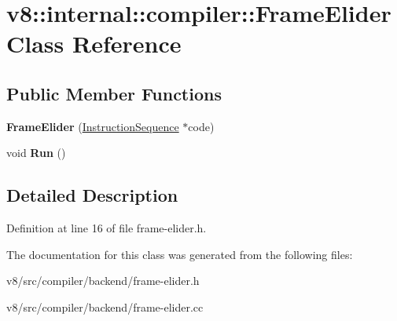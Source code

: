 \hypertarget{classv8_1_1internal_1_1compiler_1_1FrameElider}{}\section{v8\+:\+:internal\+:\+:compiler\+:\+:Frame\+Elider Class Reference}
\label{classv8_1_1internal_1_1compiler_1_1FrameElider}
\subsection*{Public Member Functions}
\begin{DoxyCompactItemize}
\item 
\mbox{\label{classv8_1_1internal_1_1compiler_1_1FrameElider_a33cd828ec6aafd685b955e1cf6670d43}} 
{\bfseries Frame\+Elider} (\mbox{\hyperlink{classv8_1_1internal_1_1compiler_1_1InstructionSequence}{Instruction\+Sequence}} $\ast$code)
\item 
\mbox{\label{classv8_1_1internal_1_1compiler_1_1FrameElider_af6de175cbbb0bd8c3f5d16a6745b133b}} 
void {\bfseries Run} ()
\end{DoxyCompactItemize}


\subsection{Detailed Description}


Definition at line 16 of file frame-\/elider.\+h.



The documentation for this class was generated from the following files\+:\begin{DoxyCompactItemize}
\item 
v8/src/compiler/backend/frame-\/elider.\+h\item 
v8/src/compiler/backend/frame-\/elider.\+cc\end{DoxyCompactItemize}
